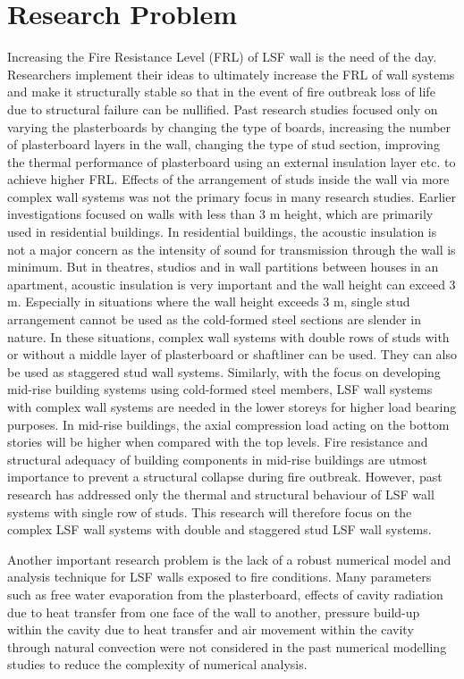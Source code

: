 \section{Research Problem}

Increasing the Fire Resistance Level (FRL) of LSF wall is the need of the day. Researchers implement their ideas to ultimately increase the FRL of wall systems and make it structurally stable so that in the event of fire outbreak loss of life due to structural failure can be nullified. Past research studies focused only on varying the plasterboards by changing the type of boards, increasing the number of plasterboard layers in the wall, changing the type of stud section, improving the thermal performance of plasterboard using an external insulation layer etc. to achieve higher FRL. Effects of the arrangement of studs inside the wall via more complex wall systems was not the primary focus in many research studies. Earlier investigations focused on walls with less than 3 m height, which are primarily used in residential buildings. In residential buildings, the acoustic insulation is not a major concern as the intensity of sound for transmission through the wall is minimum. But in theatres, studios and in wall partitions between houses in an apartment, acoustic insulation is very important and the wall height can exceed 3 m. Especially in situations where the wall height exceeds 3 m, single stud arrangement cannot be used as the cold-formed steel sections are slender in nature. In these situations, complex wall systems with double rows of studs with or without a middle layer of plasterboard or shaftliner can be used. They can also be used as staggered stud wall systems. Similarly, with the focus on developing mid-rise building systems using cold-formed steel members, LSF wall systems with complex wall systems are needed in the lower storeys for higher load bearing purposes. In mid-rise buildings, the axial compression load acting on the bottom stories will be higher when compared with the top levels. Fire resistance and structural adequacy of building components in mid-rise buildings are utmost importance to prevent a structural collapse during fire outbreak. However, past research has addressed only the thermal and structural behaviour of LSF wall systems with single row of studs. This research will therefore focus on the complex LSF wall systems with double and staggered stud LSF wall systems. 

Another important research problem is the lack of a robust numerical model and analysis technique for LSF walls exposed to fire conditions. Many parameters such as free water evaporation from the plasterboard, effects of cavity radiation due to heat transfer from one face of the wall to another, pressure build-up within the cavity due to heat transfer and air movement within the cavity through natural convection were not considered in the past numerical modelling studies to reduce the complexity of numerical analysis. 

